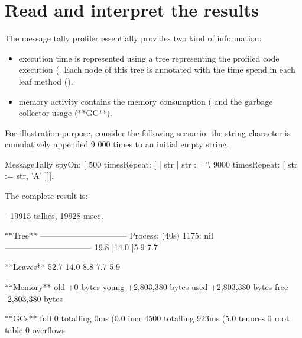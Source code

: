 \documentclass[a4paper,10pt,twoside]{book}
\begin{document}
\section{Read and interpret the results} 
The message tally profiler essentially provides two kind of information:
\begin{itemize}
\item execution time is represented using a tree representing the profiled code execution (. Each node of this tree is annotated with the time spend in each leaf method (). 

\item memory activity contains the memory consumption ( and the garbage collector usage (**GC**).
\end{itemize}

For illustration purpose, consider the following scenario: the string character  is cumulatively appended 9 000 times to an initial empty string.


\begin{code}{}
MessageTally spyOn: 
     [ 500 timesRepeat: [
                     | str |  
                     str := ''. 
                     9000 timesRepeat: [ str := str, 'A' ]]].
\end{code} 

The complete result is:

\begin{code}
 - 19915 tallies, 19928 msec.

**Tree**
--------------------------------
Process: (40s)  1175: nil
--------------------------------
19.8%
  |14.0%
  |5.9%
7.7%

**Leaves**
52.7%
14.0%
8.8%
7.7%
5.9%

**Memory**
	old			+0 bytes
	young		+2,803,380 bytes
	used		+2,803,380 bytes
	free		-2,803,380 bytes

**GCs**
	full			0 totalling 0ms (0.0%
	incr		4500 totalling 923ms (5.0%
	tenures		0
	root table	0 overflows
\end{code}
\end{document}
